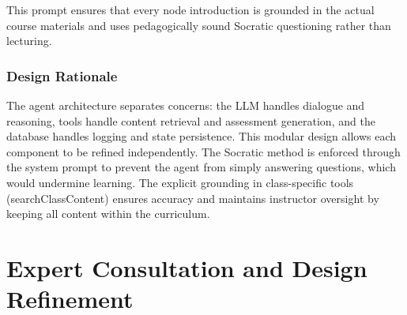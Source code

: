 \documentclass{stylefiles/capstone}
\begin{document}




This prompt ensures that every node introduction is grounded in the actual course materials and uses pedagogically sound Socratic questioning rather than lecturing.

\subsubsection{Design Rationale}

The agent architecture separates concerns: the LLM handles dialogue and reasoning, tools handle content retrieval and assessment generation, and the database handles logging and state persistence. This modular design allows each component to be refined independently. The Socratic method is enforced through the system prompt to prevent the agent from simply answering questions, which would undermine learning. The explicit grounding in class-specific tools (searchClassContent) ensures accuracy and maintains instructor oversight by keeping all content within the curriculum.

\section{Expert Consultation and Design Refinement}
\end{document}
